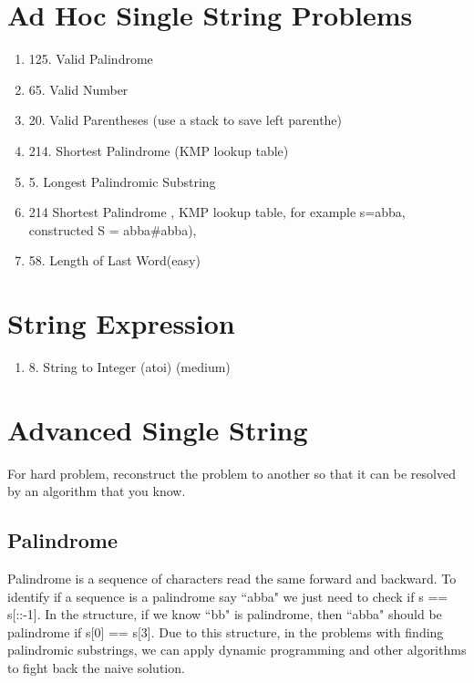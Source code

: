 \documentclass[../main.tex]{subfiles}
\begin{document}
\section{Ad Hoc Single String Problems}
\label{string_ad_hoc}
\begin{enumerate}
    \item 125. Valid Palindrome
    \item 65. Valid Number
    \item 20. Valid Parentheses (use a stack to save left parenthe)
    \item 214. Shortest Palindrome (KMP lookup table)
    \item 5. Longest Palindromic Substring
    \item 214 Shortest Palindrome , KMP lookup table, for example s=abba, constructed S = abba\#abba),
    \item 58. Length of Last Word(easy)
\end{enumerate}

\section{String Expression}
\begin{enumerate}
    \item 8. String to Integer (atoi) (medium)
\end{enumerate}
\section{Advanced Single String}
\label{string_advanced_single}
    For hard problem, reconstruct the problem to another so that it can be resolved by an algorithm that you know.
\subsection{Palindrome}
Palindrome is a sequence of characters read the same forward and backward. To identify if a sequence is a palindrome say ``abba" we just need to check if s == s[::-1]. In the structure, if we know ``bb" is palindrome, then ``abba" should be palindrome if s[0] == s[3]. Due to this structure, in the problems with finding palindromic substrings, we can apply dynamic programming and other algorithms to fight back the naive solution. 
\end{document}
